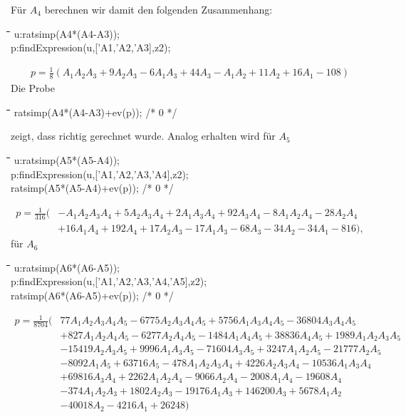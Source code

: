 \documentclass[11pt]{article}
\newcommand{\br}[1]{\ensuremath{\left(#1\right)}}
\newenvironment{code}{\tt \begin{tabbing}
\hskip12pt\=\hskip12pt\=\hskip12pt\=\hskip12pt\=\hskip5cm\=\hskip5cm\=\kill}
{\end{tabbing}}
\begin{document}
Für $A_4$ berechnen wir damit den folgenden Zusammenhang:
\begin{code}
u:ratsimp(A4*(A4-A3));\\
p:findExpression(u,['A1,'A2,'A3],z2);
\end{code}
\begin{gather*}
  p=\frac18\br{A_{1}A_{2}A_{3}+9A_{2}A_{3}-6A_{1}A_{3}+44A_{3}-
    A_{1}A_{2}+11A_{2}+16A_{1}-108}
\end{gather*}
Die Probe
\begin{code}
ratsimp(A4*(A4-A3)+ev(p)); /* 0 */
\end{code}
zeigt, dass richtig gerechnet wurde.
Analog erhalten wird für $A_5$ 
\begin{code}
u:ratsimp(A5*(A5-A4)); \\
p:findExpression(u,['A1,'A2,'A3,'A4],z2);\\
ratsimp(A5*(A5-A4)+ev(p)); /* 0 */
\end{code}
\begin{align*}
  p=\frac{1}{316}\Big(&
  -A_{1}A_{2}A_{3}A_{4}+5A_{2}A_{3}A_{4}+2A_{1}A_{3}A_{4} +92A_{3}A_{4}
  -8A_{1}A_{2}A_{4}-28A_{2}A_{4}\\ &+16A_{1}A_{4}+192A_{4} +17A_{2}A_{3}
  -17A_{1}A_{3}-68 A_{3}-34A_{2}-34A_{1}-816\Big),
\end{align*}
für $A_6$
\begin{code}
u:ratsimp(A6*(A6-A5));\\
p:findExpression(u,['A1,'A2,'A3,'A4,'A5],z2);\\
ratsimp(A6*(A6-A5)+ev(p)); /* 0 */
\end{code}
\begin{align*}
  p=\frac{1}{8704}\Big(& 77A_{1}A_{2}A_{3}A_{4}A_{5}-6775A_{2}A_{3}A_{4}A_{5}
  +5756A_{1}A_{3}A_{4}A_{5}-36804A_{3}A_{4}A_{5}\\ &+827A_{1}A_{2}A_{4}A_{5}
  -6277A_{2}A_{4}A_{5}-1484A_{1}A_{4}A_{5}+38836A_{4}A_{5}
  +1989A_{1}A_{2}A_{3}A_{5}\\ &-15419A_{2}A_{3}A_{5}+9996A_{1}A_{3}A_{5}
  -71604A_{3}A_{5}+3247A_{1}A_{2}A_{5}-21777A_{2}A_{5} \\ &-8092A_{1}A_{5}
  +63716A_{5} -478A_{1}A_{2}A_{3}A_{4}+4226A_{2}A_{3}A_{4}
  -10536A_{1}A_{3}A_{4} \\ &+69816A_{3}A_{4}+ 2262A_{1}A_{2}A_{4}
  -9066A_{2}A_{4} -2008A_{1}A_{4}-19608A_{4}\\&-374A_{1}A_{2}A_{3}
  +1802A_{2}A_{3} -19176A_{1}A_{3} +146200A_{3}+5678A_{1}A_{2} \\&-40018A_{2}
  -4216A_{1} +26248 \Big) 
\end{align*}
\end{document}
